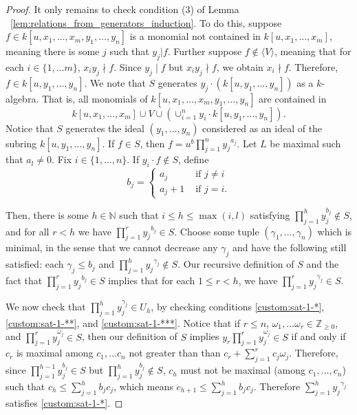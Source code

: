 \documentclass{amsart}
\theoremstyle{plain}
\theoremstyle{definition}
\theoremstyle{remark}
\numberwithin{equation}{section}
\newcommand\BN{{\mathbb N}}
\newcommand{\halfcan}{L}
\begin{document}
\begin{proof}
It only remains to check condition (3) of Lemma ~\ref{lem:relations_from_generators_induction}. To do this, suppose $f\in k[u, x_1, \ldots, x_m, y_1, \ldots, y_n]$ is a monomial not contained in $k[u, x_1, \ldots, x_m]$, meaning there is some $j$ such that $y_j|f$.  Further suppose $f\not\in \langle V \rangle$, meaning that for each $i\in \{1, \ldots m\}$, $x_iy_j \nmid f$. Since $y_j \mid f$ but $x_iy_j \nmid f$, we obtain $x_i\nmid f$.  Therefore, $f\in k[u, y_1, \ldots, y_n]$.  We note that $S$ generates $y_j \cdot (k[u,y_1, \ldots, y_n])$ as a $k$-algebra.  That is, all monomials of $k[u, x_1, \ldots, x_m, y_1, \ldots, y_n]$ are contained in
\[
	k[u, x_1, \ldots, x_m] \cup V \cup \left(\cup_{i=1}^n y_i \cdot k[u, y_1, \ldots, y_n]\right). 
\]
Notice that $S$ generates the ideal $(y_1, \ldots, y_n)$ considered as an ideal of the subring $k[u, y_1, \ldots, y_n]$.  If $f\in S$, then $f=u^b \prod_{j=1}^n {y_j}^{a_j}$. Let $\halfcan$ be maximal such that $a_l\ne 0$.
Fix $i \in \{1, \ldots, n\}$. If $y_i \cdot f \notin S$, define
$$
b_j = \begin{cases}
	a_j &\text{ if } j \neq i\\
	a_j + 1 &\text{ if } j=i.
\end{cases}$$

\noindent
Then, there is some $h \in \BN$ such that $i \le h \le \max(i, l)$ satisfying $\prod_{j = 1}^h y_j^{b_j}\not\in S$, 
and for all $r<h$ we have $\prod_{j=1}^r {y_j}^{b_j}\in S$.  
Choose some tuple $(\gamma_1, \ldots, \gamma_n)$ which is minimal, in the sense that we cannot decrease any $\gamma_j$ 
and have the following still satisfied: each $\gamma_j\le b_j$ 
and $\prod_{j=1}^h {y_j}^{\gamma_j}\not\in S.$ Our recursive definition of 
$S$ and the fact that $\prod_{j=1}^r {y_j}^{b_j}\in S$ implies that for each $1\le r< h$, we have $\prod_{j=1}^r {y_j}^{\gamma_j}\in S$.

We now check that $\prod_{j=1}^h y_j^{\gamma_j}\in U_{h}$, by checking conditions \ref{custom:sat-1-*}, \ref{custom:sat-1-**}, and \ref{custom:sat-1-***}.  
Notice that if $r\le n$, $\omega_1, \ldots \omega_r\in \mathbb{Z}_{\ge 0}$, and $\prod_{j=1}^r y_j^{\omega_j}\in S$, then our definition of $S$ implies $y_r\prod_{j=1}^r y_j^{\omega_j}\in S$ if and only if $c_r$ is maximal among $c_1, \ldots c_n$ not greater than than $c_r + \sum_{j=1}^r c_j \omega_j$.
Therefore, since $\prod_{j=1}^{h-1} y_j^{b_j}\in S$ but $\prod_{j=1}^h y_j^{b_j}\not\in S$, $c_h$ must not be maximal (among $c_1, \ldots, c_n$) such that $c_h \le \sum_{j=1}^h b_jc_j$, which means $c_{h+1}\le \sum_{j=1}^h b_jc_j$.  Therefore $\sum_{j=1}^h {y_j}^{\gamma_j}$ satisfies \ref{custom:sat-1-*}.  


\end{proof}
\end{document}
